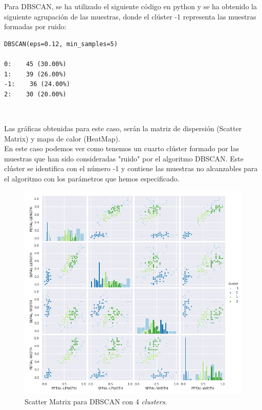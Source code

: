 \documentclass[a4paper, 20pt]{article}
\begin{document}
{Para DBSCAN, se ha utilizado el siguiente código en python y se ha obtenido la siguiente agrupación de las muestras, donde el clúster -1 representa las muestras formadas por ruido:\\

\begin{lstlisting}
DBSCAN(eps=0.12, min_samples=5)

0:    45 (30.00%)
1:    39 (26.00%)
-1:    36 (24.00%)
2:    30 (20.00%)
\end{lstlisting}\

Las gráficas obtenidas para este caso, serán la matriz de dispersión (Scatter Matrix) y mapa de calor (HeatMap).\\

En este caso podemos ver como tenemos un cuarto clúster formado por las muestras que han sido consideradas "ruido" por el algoritmo DBSCAN. Este clúster se identifica con el número -1 y contiene las muestras no alcanzables para el algoritmo con los parámetros que hemos especificado.

\begin{figure}[h]
\centering
\includegraphics[scale=0.64]{dani/scatmatrixDBSCANIRIS.png}
\caption{Scatter Matrix para DBSCAN con 4 \textit{clusters}.}
\label{smdb}
\end{figure}

\clearpage

}
\end{document}
